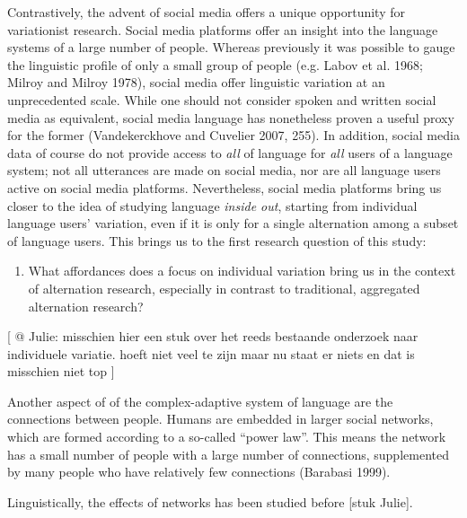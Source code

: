 \documentclass[
  letterpaper,
  DIV=11,
  numbers=noendperiod,
  oneside]{scrartcl}
\providecommand{\tightlist}{%
  \setlength{\itemsep}{0pt}\setlength{\parskip}{0pt}}\usepackage{longtable,booktabs,array}
\begin{document}
Contrastively, the advent of social media offers a unique opportunity
for variationist research. Social media platforms offer an insight into
the language systems of a large number of people. Whereas previously it
was possible to gauge the linguistic profile of only a small group of
people (e.g. Labov et al. 1968; Milroy and Milroy 1978), social media
offer linguistic variation at an unprecedented scale.
While one should not consider spoken and written social media as
equivalent, social media language has nonetheless proven a useful proxy
for the former (Vandekerckhove and Cuvelier 2007, 255). In addition,
social media data of course do not provide access to \emph{all} of
language for \emph{all} users of a language system; not all utterances
are made on social media, nor are all language users active on social
media platforms. Nevertheless, social media platforms bring us closer to
the idea of studying language \emph{inside out}, starting from
individual language users' variation, even if it is only for a single
alternation among a subset of language users. This brings us to the
first research question of this study:

\begin{enumerate}
\def\labelenumi{\arabic{enumi}.}
\tightlist
\item
  What affordances does a focus on individual variation bring us in the
  context of alternation research, especially in contrast to
  traditional, aggregated alternation research?
\end{enumerate}

{[} @ Julie: misschien hier een stuk over het reeds bestaande onderzoek
naar individuele variatie. hoeft niet veel te zijn maar nu staat er
niets en dat is misschien niet top {]}

Another aspect of of the complex-adaptive system of language are the
connections between people. Humans are embedded in larger social
networks, which are formed according to a so-called ``power law''. This
means the network has a small number of people with a large number of
connections, supplemented by many people who have relatively few
connections (Barabasi 1999).

Linguistically, the effects of networks has been studied before {[}stuk
Julie{]}.
\end{document}
